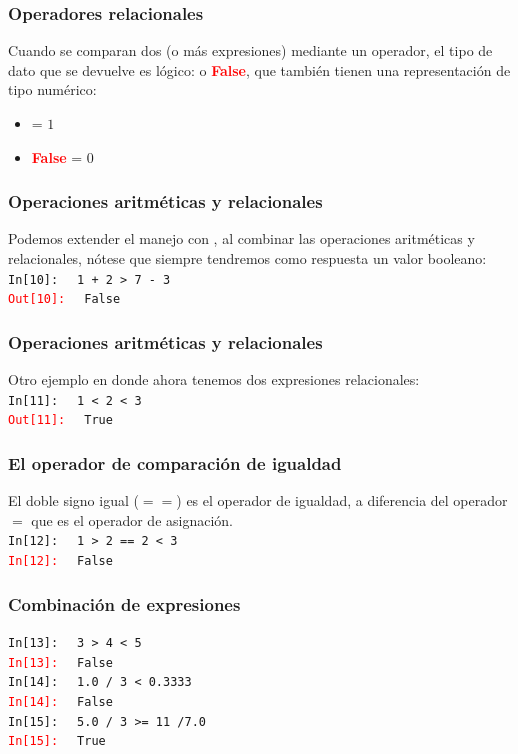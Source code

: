 \documentclass[12pt]{beamer}
\begin{document}
\begin{frame}
\frametitle{Operadores relacionales}
Cuando se comparan dos (o más expresiones) mediante un operador, el tipo de dato que se devuelve es lógico:  o \textcolor{red}{\textbf{False}}, que también tienen una representación de tipo numérico:
\pause
\begin{itemize}
\item[\ding{212}]  = $1$
\item[\ding{212}] \textcolor{red}{\textbf{False}} = $0$
\end{itemize}
\end{frame}
\begin{frame}[fragile]
\frametitle{Operaciones aritméticas y relacionales}
Podemos extender el manejo con \python, al combinar las operaciones aritméticas y relacionales, nótese que siempre tendremos como respuesta un valor booleano:
\\
\bigskip
\textcolor{ao}{\texttt{In[10]: }} \verb| 1 + 2 > 7 - 3| \\
\pause
\textcolor{red}{\texttt{Out[10]: }} \verb| False|
\end{frame}
\begin{frame}[fragile]
\frametitle{Operaciones aritméticas y relacionales}
Otro ejemplo en donde ahora tenemos dos expresiones relacionales:
\\
\bigskip
\textcolor{ao}{\texttt{In[11]: }} \verb| 1 < 2 < 3| \\
\pause
\textcolor{red}{\texttt{Out[11]: }} \verb| True|
\end{frame}
\begin{frame}[fragile]
\frametitle{El operador de comparación de igualdad}
El doble signo igual ($==$) es el operador de igualdad, a diferencia del operador $=$ que es el operador de asignación.
\\[1em]
\textcolor{ao}{\texttt{In[12]: }} \verb| 1 > 2 == 2 < 3| \\
\pause
\textcolor{red}{\texttt{In[12]: }} \verb| False|
\end{frame}
\begin{frame}[fragile]
\frametitle{Combinación de expresiones}
\textcolor{ao}{\texttt{In[13]: }} \verb| 3 > 4 < 5| \\
\pause
\textcolor{red}{\texttt{In[13]: }} \verb| False|
\\
\bigskip
\pause
\textcolor{ao}{\texttt{In[14]: }} \verb| 1.0 / 3 < 0.3333| \\
\pause
\textcolor{red}{\texttt{In[14]: }} \verb| False|
\\
\bigskip
\pause
\textcolor{ao}{\texttt{In[15]: }} \verb| 5.0 / 3 >= 11 /7.0| \\
\pause
\textcolor{red}{\texttt{In[15]: }} \verb| True|
\end{frame}
\end{document}
